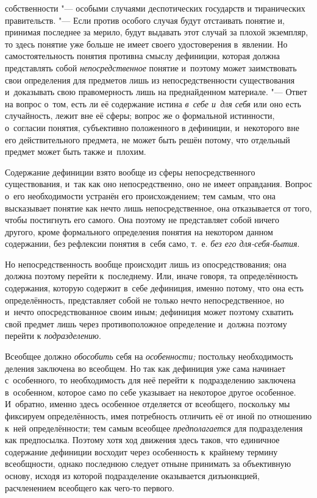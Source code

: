 собственности "--- особыми случаями деспотических государств и
тиранических правительств. "--- Если против особого случая
будут отстаивать понятие и, принимая последнее за мерило, будут выдавать
этот случай за плохой экземпляр, то здесь понятие уже больше не имеет
своего удостоверения в~явлении. Но самостоятельность понятия противна
смыслу дефиниции, которая должна представлять собой
{\em непосредственное}
понятие и~поэтому может заимствовать свои определения для
предметов лишь из непосредственности существования и~доказывать свою
правомерность лишь на преднайденном материале. "--- Ответ на
вопрос о~том, есть ли её содержание истина
{\em в~себе и~для себя}
или оно есть случайность, лежит вне её сферы; вопрос же о
формальной истинности, о~согласии понятия, субъективно положенного в
дефиниции, и~некоторого вне его действительного предмета, не может быть
решён потому, что отдельный предмет может быть также и~плохим.

Содержание дефиниции взято вообще из сферы непосредственного
существования, и~так как оно непосредственно, оно не имеет оправдания.
Вопрос о~его необходимости устранён его происхождением; тем самым, что она
высказывает понятие как нечто лишь непосредственное, она отказывается от
того, чтобы постигнуть его самого. Она поэтому не представляет собой ничего
другого, кроме формального определения понятия на некотором данном
содержании, без рефлексии понятия в~себя само, т.~е.
{\em без его для-себя-бытия}.

Но непосредственность вообще происходит лишь из
опосредствования; она должна поэтому перейти к~последнему. Или,
иначе говоря, та определённость содержания, которую содержит
в~себе дефиниция, именно потому, что она есть определённость, представляет
собой не только нечто непосредственное, но и~нечто опосредствованное своим
иным; дефиниция может поэтому схватить свой предмет лишь через
противоположное определение и~должна поэтому перейти к
{\em подразделению}.


Всеобщее должно {\em обособить} себя на {\em особенности;}
постольку необходимость деления заключена во всеобщем. Но так
как дефиниция уже сама начинает с~особенного, то необходимость для неё
перейти к~подразделению заключена в~особенном, которое само по себе
указывает на некоторое другое особенное. И~обратно, именно здесь особенное
отделяется от всеобщего, поскольку мы фиксируем определённость, имея
потребность отличить её от иной по отношению к~ней определённости; тем
самым всеобщее {\em предполагается}
для подразделения как предпосылка. Поэтому хотя ход движения
здесь таков, что единичное содержание дефиниции восходит через особенность
к~крайнему термину всеобщности, однако последнюю следует отныне принимать
за объективную основу, исходя из которой подразделение оказывается
дизъюнкцией, расчленением всеобщего как чего-то первого.

